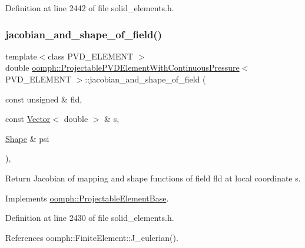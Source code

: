 Definition at line 2442 of file solid\+\_\+elements.\+h.

\mbox{\label{classoomph_1_1ProjectablePVDElementWithContinuousPressure_a9da58f06068f1f3b48e87bb6cbc97018}} 
\subsubsection{\texorpdfstring{jacobian\+\_\+and\+\_\+shape\+\_\+of\+\_\+field()}{jacobian\_and\_shape\_of\_field()}}
{\footnotesize\ttfamily template$<$class P\+V\+D\+\_\+\+E\+L\+E\+M\+E\+NT $>$ \\
double \hyperlink{classoomph_1_1ProjectablePVDElementWithContinuousPressure}{oomph\+::\+Projectable\+P\+V\+D\+Element\+With\+Continuous\+Pressure}$<$ P\+V\+D\+\_\+\+E\+L\+E\+M\+E\+NT $>$\+::jacobian\+\_\+and\+\_\+shape\+\_\+of\+\_\+field (\begin{DoxyParamCaption}\item[{const unsigned \&}]{fld,  }\item[{const \hyperlink{classoomph_1_1Vector}{Vector}$<$ double $>$ \&}]{s,  }\item[{\hyperlink{classoomph_1_1Shape}{Shape} \&}]{psi }\end{DoxyParamCaption})\hspace{0.3cm}{\ttfamily [inline]}, {\ttfamily [virtual]}}



Return Jacobian of mapping and shape functions of field fld at local coordinate s. 



Implements \hyperlink{classoomph_1_1ProjectableElementBase_ad45c21b58c0985d52f68ab2d79cbb488}{oomph\+::\+Projectable\+Element\+Base}.



Definition at line 2430 of file solid\+\_\+elements.\+h.



References oomph\+::\+Finite\+Element\+::\+J\+\_\+eulerian().

